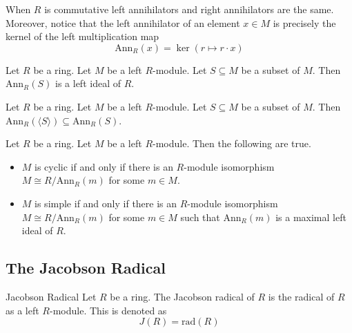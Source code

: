\documentclass[a4paper]{article}
\begin{document}
When $R$ is commutative left annihilators and right annihilators are the same. Moreover, notice that the left annihilator of an element $x\in M$ is precisely the kernel of the left multiplication map $$\text{Ann}_R(x)=\ker(r\mapsto r\cdot x)$$

\begin{lmm}{}{} Let $R$ be a ring. Let $M$ be a left $R$-module. Let $S\subseteq M$ be a subset of $M$. Then $\text{Ann}_R(S)$ is a left ideal of $R$. 
\end{lmm}

\begin{prp}{}{} Let $R$ be a ring. Let $M$ be a left $R$-module. Let $S\subseteq M$ be a subset of $M$. Then $\text{Ann}_R(\langle S\rangle)\subseteq\text{Ann}_R(S)$. 
\end{prp}

\begin{prp}{}{} Let $R$ be a ring. Let $M$ be a left $R$-module. Then the following are true. 
\begin{itemize}
\item $M$ is cyclic if and only if there is an $R$-module isomorphism $M\cong R/\text{Ann}_R(m)$ for some $m\in M$. 
\item $M$ is simple if and only if there is an $R$-module isomorphism $M\cong R/\text{Ann}_R(m)$ for some $m\in M$ such that $\text{Ann}_R(m)$ is a maximal left ideal of $R$. 
\end{itemize}
\end{prp}

\subsection{The Jacobson Radical}
\begin{defn}{Jacobson Radical}{} Let $R$ be a ring. The Jacobson radical of $R$ is the radical of $R$ as a left $R$-module. This is denoted as $$J(R)=\text{rad}(R)$$
\end{defn}
\end{document}
